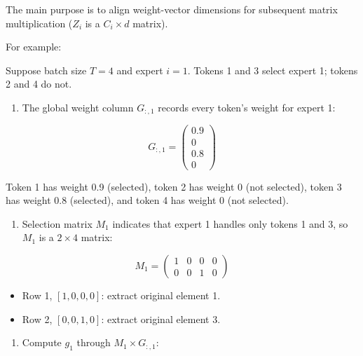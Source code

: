 The main purpose is to align weight-vector dimensions for subsequent matrix multiplication (\(Z_i\) is a \(C_i\times d\) matrix).

For example:

Suppose batch size \(T=4\) and expert \(i=1\). Tokens 1 and 3 select expert 1; tokens 2 and 4 do not.

\begin{enumerate}
\def\labelenumi{\arabic{enumi}.}
\tightlist
\item
{}
  The global weight column \(G_{:,1}\) records every token's weight for expert 1:
\end{enumerate}

\[
G_{:,1} =
\begin{pmatrix}
0.9 \\
0 \\
0.8 \\
0
\end{pmatrix}
\]

Token 1 has weight 0.9 (selected), token 2 has weight 0 (not selected), token 3 has weight 0.8 (selected), and token 4 has weight 0 (not selected).

\begin{enumerate}
\def\labelenumi{\arabic{enumi}.}
\setcounter{enumi}{1}
\tightlist
\item
{}
  Selection matrix \(M_1\) indicates that expert 1 handles only tokens 1 and 3, so \(M_1\) is a \(2 \times 4\) matrix:
\end{enumerate}

\[
M_1 =
\begin{pmatrix}
1 & 0 & 0 & 0 \\
0 & 0 & 1 & 0
\end{pmatrix}
\]

\begin{itemize}
\tightlist
\item
  Row 1, \([1,0,0,0]\): extract original element 1.
\item
  Row 2, \([0,0,1,0]\): extract original element 3.
\end{itemize}

\begin{enumerate}
\def\labelenumi{\arabic{enumi}.}
\setcounter{enumi}{2}
\tightlist
\item
{}
  Compute \(g_1\) through \(M_1 \times G_{:,1}\):
\end{enumerate}

